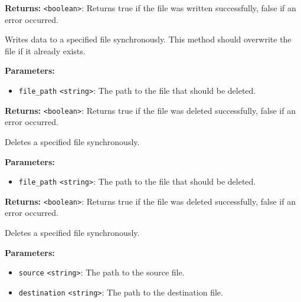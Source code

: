 \documentclass[12pt,a4paper]{article}
\begin{document}
\noindent \textbf{Returns:} \texttt{<boolean>}: Returns true if the file was written successfully, false if an error occurred.

\noindent Writes data to a specified file synchronously. This method should overwrite the file if it already exists.

\vspace{5mm}
\noindent {}


\noindent \textbf{Parameters:}
\begin{itemize}
  \item \texttt{file\_path} \texttt{<string>}: The path to the file that should be deleted.
\end{itemize}

\noindent \textbf{Returns:} \texttt{<boolean>}: Returns true if the file was deleted successfully, false if an error occurred.

\noindent Deletes a specified file synchronously.

\vspace{5mm}
\noindent {}


\noindent \textbf{Parameters:}
\begin{itemize}
  \item \texttt{file\_path} \texttt{<string>}: The path to the file that should be deleted.
\end{itemize}

\noindent \textbf{Returns:} \texttt{<boolean>}: Returns true if the file was deleted successfully, false if an error occurred.

\noindent Deletes a specified file synchronously.

\vspace{5mm}
\noindent {}


\noindent \textbf{Parameters:}
\begin{itemize}
  \item \texttt{source} \texttt{<string>}: The path to the source file.
  \item \texttt{destination} \texttt{<string>}: The path to the destination file.
\end{itemize}
\end{document}
